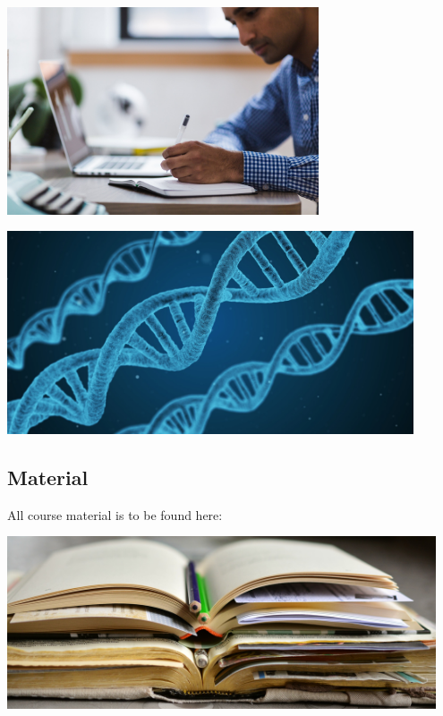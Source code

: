 \documentclass[aspectratio=1610,slidestop]{beamer}
\begin{document}
\begin{pframe}
 \begin{minipage}{0.47\textwidth}
 \begin{center}
   \includegraphics[width=0.69\textwidth]{../../images/laptop_man.jpg}
 \end{center}
 \end{minipage}%
 \begin{minipage}{0.47\textwidth}
 \begin{center}
   \includegraphics[width=0.9\textwidth]{../../images/dna.jpg}
 \end{center}
 \end{minipage}
\end{pframe}

\subsection{Material}
\begin{pframe}
 All course material is to be found here:\\

 \begin{center}
   \includegraphics[width=0.95\textwidth]{../../images/books.jpg}
 \end{center}
\end{pframe}
\end{document}
